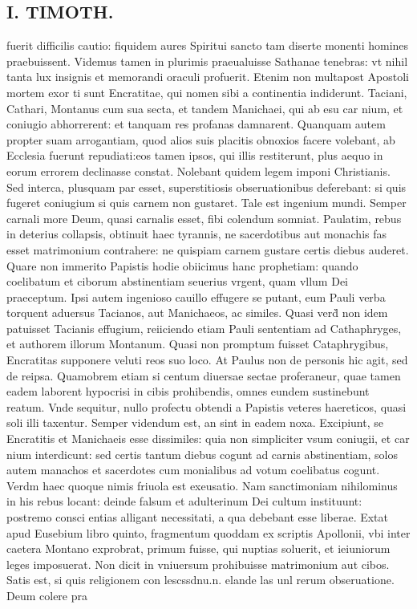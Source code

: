 \documentclass{article}
\begin{document}
\begin{pages}
\section*{I. TIMOTH. }
\marginpar{[ p.46 ]}\pstart fuerit difficilis cautio: fiquidem aures Spiritui sancto tam diserte monenti homines praebuissent. Videmus tamen in plurimis praeualuisse Sathanae tenebras: vt nihil tanta lux insignis et memorandi oraculi profuerit. Etenim non multapost Apostoli mortem exor ti sunt Encratitae, qui nomen sibi a continentia indiderunt. Taciani, Cathari, Montanus cum sua secta, et tandem Manichaei, qui ab esu car nium, et coniugio abhorrerent: et tanquam res profanas damnarent. Quanquam autem propter suam arrogantiam, quod alios suis placitis obnoxios facere volebant, ab Ecclesia fuerunt repudiati:eos tamen ipsos, qui illis restiterunt, plus aequo in eorum errorem declinasse constat. Nolebant quidem legem imponi Christianis. Sed interca, plusquam par esset, superstitiosis obseruationibus deferebant: si quis fugeret coniugium si quis carnem non gustaret. Tale est ingenium mundi. Semper carnali more Deum, quasi carnalis esset, fibi colendum somniat. Paulatim, rebus in deterius collapsis, obtinuit haec tyrannis, ne sacerdotibus aut monachis fas esset matrimonium contrahere: ne quispiam carnem gustare certis diebus auderet. Quare non immerito Papistis hodie obiicimus hanc prophetiam: quando coelibatum et ciborum abstinentiam seuerius vrgent, quam vllum Dei praeceptum. Ipsi autem ingenioso cauillo effugere se putant, eum Pauli verba torquent aduersus Tacianos, aut Manichaeos, ac similes. Quasi verd̀ non idem patuisset Tacianis effugium, reiiciendo etiam Pauli sententiam ad Cathaphryges, et authorem illorum Montanum. Quasi non promptum fuisset Cataphrygibus, Encratitas supponere veluti reos suo loco. At Paulus non de personis hic agit, sed de reipsa. Quamobrem etiam si centum diuersae sectae proferaneur, quae tamen eadem laborent hypocrisi in cibis prohibendis, omnes eundem sustinebunt reatum. Vnde sequitur, nullo profectu obtendi a Papistis veteres haereticos, quasi soli illi taxentur. Semper videndum est, an sint in eadem noxa. Excipiunt, se Encratitis et Manichaeis esse dissimiles: quia non simpliciter vsum coniugii, et car nium interdicunt: sed certis tantum diebus cogunt ad carnis abstinentiam, solos autem manachos et sacerdotes cum monialibus ad votum coelibatus cogunt. Verdm haec quoque nimis friuola est exeusatio. Nam sanctimoniam nihilominus in his rebus locant: deinde falsum et adulterinum Dei cultum instituunt: postremo consci entias alligant necessitati, a qua debebant esse liberae. Extat apud Eusebium libro quinto, fragmentum quoddam ex scriptis Apollonii, vbi inter caetera Montano exprobrat, primum fuisse, qui nuptias soluerit, et ieiuniorum leges imposuerat. Non dicit in vniuersum prohibuisse matrimonium aut cibos. Satis est, si quis religionem con lescssdnu.n. elande las unl rerum obseruatione. Deum colere pra\pend

\end{pages}
\end{document}
